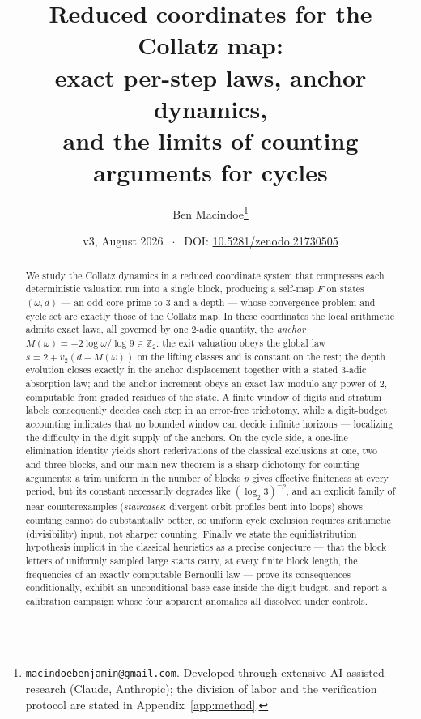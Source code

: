 \documentclass[11pt]{article}
\title{Reduced coordinates for the Collatz map:\\ exact per-step laws, anchor dynamics,\\ and the limits of counting arguments for cycles}
\author{Ben Macindoe\thanks{\texttt{macindoebenjamin@gmail.com}. Developed through extensive AI-assisted research (Claude, Anthropic); the division of labor and the verification protocol are stated in Appendix~\ref{app:method}.}}
\date{v3, August 2026 $\;\cdot\;$ DOI: \href{https://doi.org/10.5281/zenodo.21730505}{10.5281/zenodo.21730505}}
\theoremstyle{remark}
\newcommand{\Z}{\mathbb{Z}}
\newcommand{\vt}[1]{v_2\!\left(#1\right)}
\newcommand{\w}{\omega}
\newcommand{\LL}{\log_2 3}
\begin{document}
\maketitle

\begin{abstract}
We study the Collatz dynamics in a reduced coordinate system that compresses each deterministic valuation run into a single block, producing a self-map $F$ on states $(\w,d)$ --- an odd core prime to $3$ and a depth --- whose convergence problem and cycle set are exactly those of the Collatz map. In these coordinates the local arithmetic admits exact laws, all governed by one $2$-adic quantity, the \emph{anchor} $M(\w) = -2\log\w/\log 9 \in \Z_2$: the exit valuation obeys the global law $s = 2 + \vt{d - M(\w)}$ on the lifting classes and is constant on the rest; the depth evolution closes exactly in the anchor displacement together with a stated $3$-adic absorption law; and the anchor increment obeys an exact law modulo any power of $2$, computable from graded residues of the state. A finite window of digits and stratum labels consequently decides each step in an error-free trichotomy, while a digit-budget accounting indicates that no bounded window can decide infinite horizons --- localizing the difficulty in the digit supply of the anchors. On the cycle side, a one-line elimination identity yields short rederivations of the classical exclusions at one, two and three blocks, and our main new theorem is a sharp dichotomy for counting arguments: a trim uniform in the number of blocks $p$ gives effective finiteness at every period, but its constant necessarily degrades like $(\LL)^{-p}$, and an explicit family of near-counterexamples (\emph{staircases}: divergent-orbit profiles bent into loops) shows counting cannot do substantially better, so uniform cycle exclusion requires arithmetic (divisibility) input, not sharper counting. Finally we state the equidistribution hypothesis implicit in the classical heuristics as a precise conjecture --- that the block letters of uniformly sampled large starts carry, at every finite block length, the frequencies of an exactly computable Bernoulli law --- prove its consequences conditionally, exhibit an unconditional base case inside the digit budget, and report a calibration campaign whose four apparent anomalies all dissolved under controls.
\end{abstract}
\end{document}
